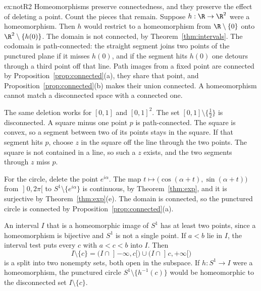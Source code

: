 \begin{solution}{ex:notR2}
\idea Homeomorphisms preserve connectedness, and they preserve the effect of deleting a point. Count the pieces that remain.
\writeup Suppose $h:\R\to\R^2$ were a homeomorphism. Then $h$ would restrict to a homeomorphism from $\R\setminus\{0\}$ onto $\R^2\setminus\{h(0)\}$. The domain is not connected, by Theorem~\ref{thm:intervals}. The codomain is path-connected: the straight segment joins two points of the punctured plane if it misses $h(0)$, and if the segment hits $h(0)$ one detours through a third point off that line. Path images from a fixed point are connected by Proposition~\ref{prop:connected}(a), they share that point, and Proposition~\ref{prop:connected}(b) makes their union connected. A homeomorphism cannot match a disconnected space with a connected one.

The same deletion works for $[0,1]$ and $[0,1]^2$. The set $[0,1]\setminus\{\frac12\}$ is disconnected. A square minus one point $p$ is path-connected. The square is convex, so a segment between two of its points stays in the square. If that segment hits $p$, choose $z$ in the square off the line through the two points. The square is not contained in a line, so such a $z$ exists, and the two segments through $z$ miss $p$.

For the circle, delete the point $e^{i\alpha}$. The map $t\mapsto\bigl(\cos(\alpha+t),\sin(\alpha+t)\bigr)$ from $\mathopen]0,2\pi[$ to $S^1\setminus\{e^{i\alpha}\}$ is continuous, by Theorem~\ref{thm:exp}, and it is surjective by Theorem~\ref{thm:exp}(e). The domain is connected, so the punctured circle is connected by Proposition~\ref{prop:connected}(a).

An interval $I$ that is a homeomorphic image of $S^1$ has at least two points, since a homeomorphism is bijective and $S^1$ is not a single point. If $a<b$ lie in $I$, the interval test puts every $c$ with $a<c<b$ into $I$. Then
\[
I\setminus\{c\}=\bigl(I\cap\mathopen]-\infty,c[\bigr)\cup\bigl(I\cap\mathopen]c,+\infty[\bigr)
\]
is a split into two nonempty sets, both open in the subspace. If $h:S^1\to I$ were a homeomorphism, the punctured circle $S^1\setminus\{h^{-1}(c)\}$ would be homeomorphic to the disconnected set $I\setminus\{c\}$.
\end{solution}

